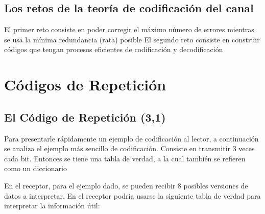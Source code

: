 \subsection{Los retos de la teoría de codificación del canal}

El primer reto consiste en poder corregir el máximo número de errores mientras se usa la mínima redundancia (rata) posible
El segundo reto consiste en construir códigos que tengan procesos eficientes de codificación y decodificación

\section{Códigos de Repetición}

\subsection{El Código de Repetición (3,1)}

Para presentarle rápidamente un ejemplo de codificación al lector, a continuación se analiza el ejemplo más sencillo de codificación. Consiste en transmitir 3 veces cada bit. 
Entonces se tiene una tabla de verdad, a la cual también se refieren como un diccionario

	\begin{table}[h!]
		\captionsetup{justification = raggedright,singlelinecheck = false}
		\caption{Alguna descripción.}
		\label{tabla:tabla12}
		\centering
	\end{table}
	
En el receptor, para el ejemplo dado, se pueden recibir 8 posibles versiones de datos a interpretar. En el receptor podría usarse la siguiente tabla de verdad para interpretar la información útil:


